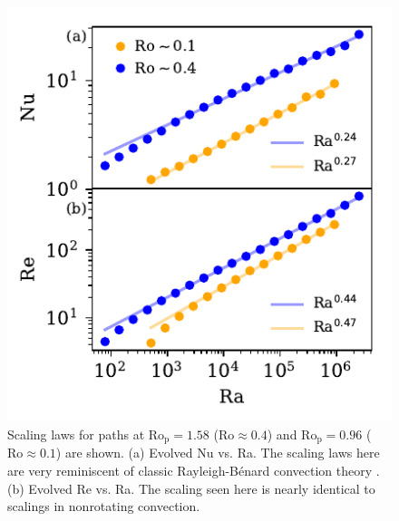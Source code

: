 \documentclass[twocolumn, amsmath, amsfonts, amssymb]{aastex62}
\newcommand{\RB}{Rayleigh-B\'{e}nard }
\newcommand{\pro}{\ensuremath{\text{Ro}_{\text{p}}}}
\begin{document}
\begin{figure}[t!]
    \includegraphics{nu_and_re.pdf}
    \caption{Scaling laws for paths at $\pro = 1.58$ ($\text{Ro} \approx 0.4$) and
    $\pro = 0.96$ ($\text{Ro} \approx 0.1$) are shown. 
    (a) Evolved Nu vs. Ra. The scaling laws here are very reminiscent of classic \RB convection
    theory \citep{ahlers&all2009}.
    (b) Evolved Re vs. Ra.
    The scaling seen here is nearly identical to scalings in nonrotating convection.
    \label{fig:nu_and_re} }
\end{figure}
\end{document}

